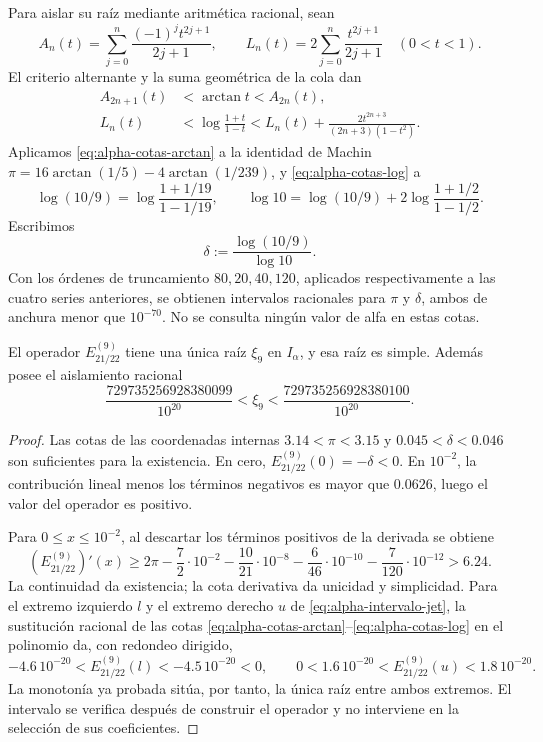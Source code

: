 Para aislar su raíz mediante aritmética racional, sean
\[
 A_n(t)=\sum_{j=0}^{n}\frac{(-1)^jt^{2j+1}}{2j+1},\qquad
 L_n(t)=2\sum_{j=0}^{n}\frac{t^{2j+1}}{2j+1}\quad(0<t<1).
\]
El criterio alternante y la suma geométrica de la cola dan
\begin{align}
 A_{2n+1}(t)&<\arctan t<A_{2n}(t),
 \label{eq:alpha-cotas-arctan}\\
 L_n(t)&<\log\frac{1+t}{1-t}
 <L_n(t)+\frac{2t^{2n+3}}{(2n+3)(1-t^2)}.
 \label{eq:alpha-cotas-log}
\end{align}
Aplicamos \eqref{eq:alpha-cotas-arctan} a la identidad de Machin
\(\pi=16\arctan(1/5)-4\arctan(1/239)\), y
\eqref{eq:alpha-cotas-log} a
\[
 \log(10/9)=\log\frac{1+1/19}{1-1/19},\qquad
 \log 10=\log(10/9)+2\log\frac{1+1/2}{1-1/2}.
\]
Escribimos
\[
 \delta:=\frac{\log(10/9)}{\log 10}.
\]
Con los órdenes de truncamiento \(80,20,40,120\), aplicados
respectivamente a las cuatro series anteriores, se obtienen intervalos
racionales para \(\pi\) y \(\delta\), ambos de anchura menor que
\(10^{-70}\). No se consulta ningún valor de alfa en estas cotas.

\begin{proposition}
\label{prop:alpha-raiz-jet}
El operador \(E_{21/22}^{(9)}\) tiene una única raíz
\(\xi_9\) en \(I_\alpha\), y esa raíz es simple. Además posee el
aislamiento racional
\begin{equation}
 \frac{729735256928380099}{10^{20}}
 <\xi_9<\frac{729735256928380100}{10^{20}}.
 \label{eq:alpha-intervalo-jet}
\end{equation}
\end{proposition}

\begin{proof}
Las cotas de las coordenadas internas
\(3.14<\pi<3.15\) y
\(0.045<\delta<0.046\) son suficientes para la existencia. En cero,
\(E_{21/22}^{(9)}(0)=-\delta<0\). En \(10^{-2}\), la contribución
lineal menos los términos negativos es mayor que \(0.0626\), luego el
valor del operador es positivo.

Para \(0\leq x\leq10^{-2}\), al descartar los términos positivos de
la derivada se obtiene
\[
 (E_{21/22}^{(9)})'(x)
 \geq2\pi-\frac72\cdot10^{-2}
 -\frac{10}{21}\cdot10^{-8}-\frac6{46}\cdot10^{-10}
 -\frac7{120}\cdot10^{-12}>6.24.
\]
La continuidad da existencia; la cota derivativa da unicidad y
simplicidad. Para el extremo izquierdo \(l\) y el extremo derecho \(u\)
de \eqref{eq:alpha-intervalo-jet}, la sustitución racional de las cotas
\eqref{eq:alpha-cotas-arctan}--\eqref{eq:alpha-cotas-log} en el polinomio
da, con redondeo dirigido,
\[
 -4.6\,10^{-20}<E_{21/22}^{(9)}(l)<-4.5\,10^{-20}<0,
 \qquad
 0<1.6\,10^{-20}<E_{21/22}^{(9)}(u)<1.8\,10^{-20}.
\]
La monotonía ya probada sitúa, por tanto, la única raíz entre ambos
extremos. El intervalo se verifica después de construir el operador y no
interviene en la selección de sus coeficientes.
\end{proof}

